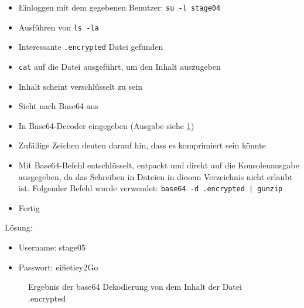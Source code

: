 \documentclass[12pt,a4paper,titlepage,oneside]{scrartcl}
\begin{document}
\begin{itemize}
  \item Einloggen mit dem gegebenen Benutzer: \lstinline{su -l stage04}
  \item Ausführen von \lstinline{ls -la} 
  \item Interessante \lstinline{.encrypted} Datei gefunden
  \item \lstinline{cat} auf die Datei ausgeführt, um den Inhalt auszugeben
  \item Inhalt scheint verschlüsselt zu sein 
  \item Sieht nach Base64 aus
  \item In Base64-Decoder eingegeben (Ausgabe siehe \ref{fig:stageeeee_base64_output})
  \item Zufällige Zeichen deuten darauf hin, dass es komprimiert sein könnte
  \item Mit Base64-Befehl entschlüsselt, entpackt und direkt auf die Konsolenausgabe ausgegeben, da das Schreiben in Dateien in diesem Verzeichnis nicht erlaubt ist. Folgender Befehl wurde verwendet: \lstinline{base64 -d .encrypted | gunzip} 
  \item Fertig
\end{itemize}
  
Lösung: 
\begin{itemize}
  \item Username: stage05
  \item Passwort: eifietiey2Go
\end{itemize}

  \begin{figure}[h!]
    \centering
    \caption{Ergebnis der base64 Dekodierung von dem Inhalt der Datei .encrypted}
    \label{fig:stageeeee_base64_output}
  \end{figure}
\end{document}
